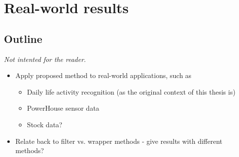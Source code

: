 
\chapter{Real-world results}

\label{Chapter6} %


\section{Outline}
\emph{Not intented for the reader.}
\begin{itemize}
  \item Apply proposed method to real-world applications, such as
    \begin{itemize}
      \item Daily life activity recognition (as the original context of this thesis is)
      \item PowerHouse sensor data
      \item Stock data?
    \end{itemize}
  \item Relate back to filter vs. wrapper methods - give results with different methods?
\end{itemize}


